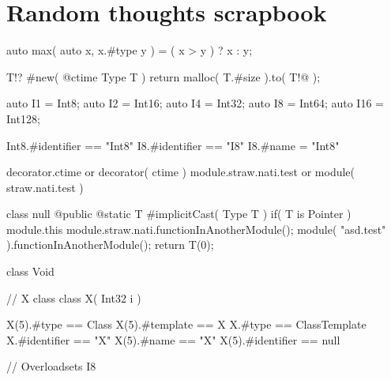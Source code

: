 \section{Random thoughts scrapbook}
\begin{code}
auto max( auto x, x.#type y ) = ( x > y ) ? x : y;

T!? #new( @ctime Type T ) {
	return malloc( T.#size ).to( T!@ );
}

auto I1 = Int8;
auto I2 = Int16;
auto I4 = Int32;
auto I8 = Int64;
auto I16 = Int128;

Int8.#identifier == "Int8"
I8.#identifier == "I8"
I8.#name = "Int8"

decorator.ctime or decorator( ctime )
module.straw.nati.test or module( straw.nati.test )

class null {
	@public @static	T #implicitCast( Type T )
		if( T is Pointer )
	{
		module.this
		module.straw.nati.functionInAnotherModule();
		module( "asd.test" ).functionInAnotherModule();
		return T(0);
	}
}

class Void {}


// X class
class X( Int32 i ) {
}

X(5).#type == Class
X(5).#template == X
X.#type == ClassTemplate
X.#identifier == "X"
X(5).#name == "X"
X(5).#identifier == null

// Overloadsets
I8
\end{code}

          
